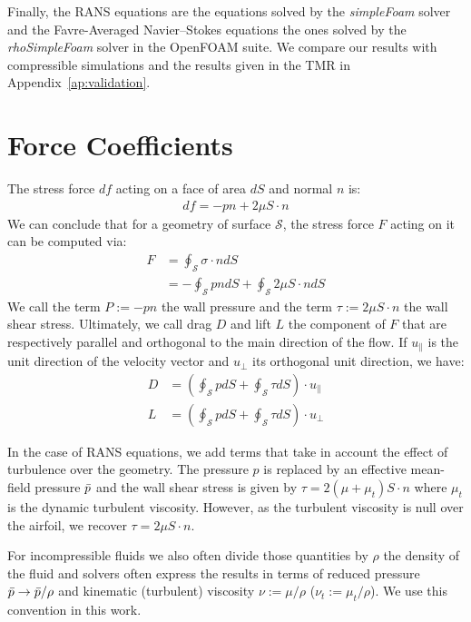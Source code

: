 \begin{subappendices}
	Finally, the RANS equations are the equations solved by the \emph{simpleFoam} solver and the Favre-Averaged Navier–Stokes equations the ones solved by the \emph{rhoSimpleFoam} solver in the OpenFOAM suite. We compare our results with compressible simulations and the results given in the TMR \cite{TMR} in Appendix~\ref{ap:validation}.
	
	\section{Force Coefficients}	
	The stress force $df$ acting on a face of area $dS$ and normal $n$ is:
	\begin{align}
		df = -pn + 2\mu S\cdot n
	\end{align}
	We can conclude that for a geometry of surface $\mathcal{S}$, the stress force $F$ acting on it can be computed via:
	\begin{align}
		F &= \oint_\mathcal{S} \sigma\cdot n dS \\
		&= -\oint_\mathcal{S} pndS + \oint_\mathcal{S} 2\mu S\cdot n dS
	\end{align}
	We call the term $P := -pn$ the wall pressure and the term $\tau := 2\mu S\cdot n$ the wall shear stress. Ultimately, we call drag $D$ and lift $L$ the component of $F$ that are respectively parallel and orthogonal to the main direction of the flow. If $u_{\parallel}$ is the unit direction of the velocity vector and $u_{\perp}$ its orthogonal unit direction, we have:
	\begin{align}
		D &= \left(\oint_\mathcal{S} p dS + \oint_\mathcal{S} \tau dS\right)\cdot u_{\parallel} \\
		L &= \left(\oint_\mathcal{S} p dS + \oint_\mathcal{S} \tau dS\right)\cdot u_{\perp}
	\end{align}
	
	In the case of RANS equations, we add terms that take in account the effect of turbulence over the geometry. The pressure $p$ is replaced by an effective mean-field pressure $\Bar{p}$ and the wall shear stress is given by $\tau = 2(\mu + \mu_t)S\cdot n$ where $\mu_t$ is the dynamic turbulent viscosity. However, as the turbulent viscosity is null over the airfoil, we recover $\tau = 2\mu S\cdot n$.
	
	For incompressible fluids we also often divide those quantities by $\rho$ the density of the fluid and solvers often express the results in terms of reduced pressure $\Bar{p} \rightarrow \Bar{p}/\rho$ and kinematic (turbulent) viscosity $\nu := \mu/\rho$ ($\nu_t := \mu_t/\rho$). We use this convention in this work.
	

\end{subappendices}
